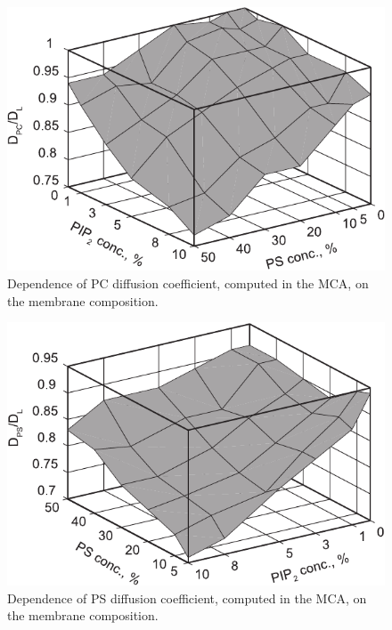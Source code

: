 \begin{figure}[!ht]
\centering
  \includegraphics{../figures/neutral_diffusion_no_color.pdf}

\caption[PC diffusion coefficient computed in MCA]{Dependence of PC diffusion coefficient, computed in the MCA, on the membrane composition.}
\label{fig:neutral_diffusion}
\end{figure}

\begin{figure}[!ht]
\centering
  \includegraphics{../figures/ps_diffusion_no_color.pdf}

\caption[PS diffusion coefficient computed in MCA]{Dependence of PS diffusion coefficient, computed in the MCA, on the membrane composition.}
\label{fig:ps_diffusion}
\end{figure}

